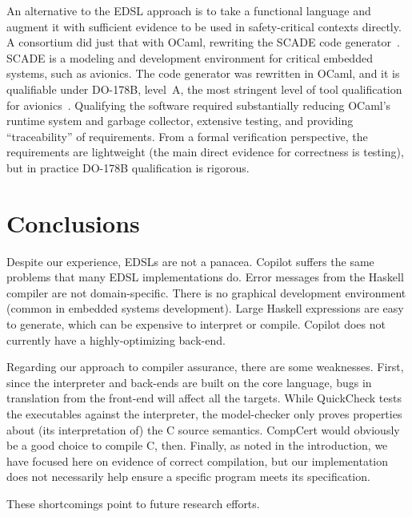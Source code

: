 \documentclass[preprint]{sigplanconf}
\begin{document}
An alternative to the EDSL approach is to take a functional language and augment
it with sufficient evidence to be used in safety-critical contexts directly.  A
consortium did just that with OCaml, rewriting the SCADE code
generator~\cite{ocaml}.  SCADE is a modeling and development environment for
critical embedded systems, such as avionics.  The code generator was rewritten
in OCaml, and it is qualifiable under DO-178B, level~A, the most stringent level
of tool qualification for avionics~\cite{DO178B}.
Qualifying the software required substantially reducing OCaml's runtime system
and garbage collector, extensive testing, and providing ``traceability'' of
requirements.  From a formal verification perspective, the requirements are
lightweight (the main direct evidence for correctness is testing), but in
practice DO-178B qualification is rigorous.  



\section{Conclusions}
\label{sec:conclusions}

Despite our experience, EDSLs are not a panacea.  Copilot suffers the same
problems that many EDSL implementations do.  Error messages from the Haskell
compiler are not domain-specific.  There is no graphical development environment
(common in embedded systems development).  Large Haskell expressions are easy to
generate, which can be expensive to interpret or compile.  Copilot does not
currently have a highly-optimizing back-end.

Regarding our approach to compiler assurance, there are some weaknesses.  First,
since the interpreter and back-ends are built on the core language, bugs in
translation from the front-end will affect all the targets.  While QuickCheck
tests the executables against the interpreter, the model-checker only proves
properties about (its interpretation of) the C source semantics.  CompCert would
obviously be a good choice to compile C, then.  Finally, as noted in the
introduction, we have focused here on evidence of correct compilation, but our
implementation does not necessarily help ensure a specific program meets its
specification.

These shortcomings point to future research efforts.
\end{document}
